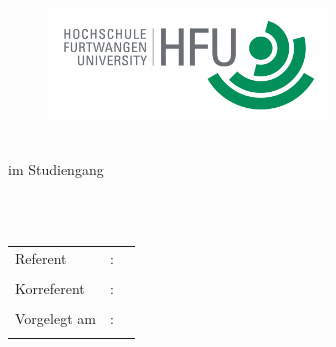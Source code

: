 \begin{titlepage}
\pagestyle{empty}

\begin{flushright}
\begin{figure}[ht]
\flushright
\includegraphics[height=3cm]{content/pictures/hfu.jpg}
\end{figure}
\end{flushright}

\begin{center}
{\fontsize{18}{22} \selectfont \docArtDerArbeit}\\[5mm]
{\fontsize{18}{22} \selectfont im Studiengang} \\[5mm]
{\fontsize{18}{22} \selectfont \docStudiengang}\\
\vspace{1cm}
\begin{onehalfspace}
{\fontsize{22}{26} \selectfont \textbf{\docTitle}}\\[5mm]
{\fontsize{18}{22} \selectfont \docUntertitle}


\end{onehalfspace}
\end{center}

\vfill
\begin{center}
\begin{tabular}{lcl}
Referent  		&:& \docErsterReferent 	\\ \\
Korreferent  	&:& \docZweiterReferent \\ \\
Vorgelegt am 	&:& \docAbgabedatum 	\\ \\
\end{tabular}
\end{center}
\end{titlepage}